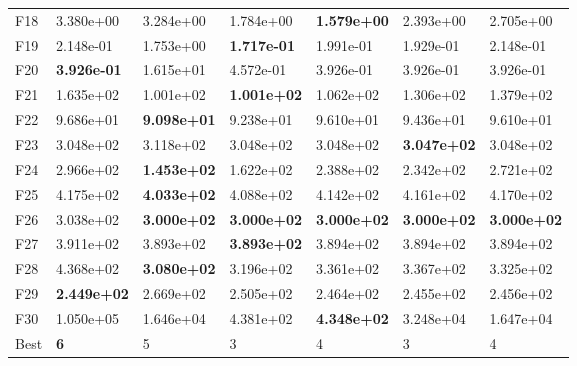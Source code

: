 \begin{tabular}{lllllll}
F18 & 3.380e+00 & 3.284e+00 & 1.784e+00 & \textbf{1.579e+00} & 2.393e+00 & 2.705e+00 \\
F19 & 2.148e-01 & 1.753e+00 & \textbf{1.717e-01} & 1.991e-01 & 1.929e-01 & 2.148e-01 \\
F20 & \textbf{3.926e-01} & 1.615e+01 & 4.572e-01 & 3.926e-01 & 3.926e-01 & 3.926e-01 \\
F21 & 1.635e+02 & 1.001e+02 & \textbf{1.001e+02} & 1.062e+02 & 1.306e+02 & 1.379e+02 \\
F22 & 9.686e+01 & \textbf{9.098e+01} & 9.238e+01 & 9.610e+01 & 9.436e+01 & 9.610e+01 \\
F23 & 3.048e+02 & 3.118e+02 & 3.048e+02 & 3.048e+02 & \textbf{3.047e+02} & 3.048e+02 \\
F24 & 2.966e+02 & \textbf{1.453e+02} & 1.622e+02 & 2.388e+02 & 2.342e+02 & 2.721e+02 \\
F25 & 4.175e+02 & \textbf{4.033e+02} & 4.088e+02 & 4.142e+02 & 4.161e+02 & 4.170e+02 \\
F26 & 3.038e+02 & \textbf{3.000e+02} & \textbf{3.000e+02} & \textbf{3.000e+02} & \textbf{3.000e+02} & \textbf{3.000e+02} \\
F27 & 3.911e+02 & 3.893e+02 & \textbf{3.893e+02} & 3.894e+02 & 3.894e+02 & 3.894e+02 \\
F28 & 4.368e+02 & \textbf{3.080e+02} & 3.196e+02 & 3.361e+02 & 3.367e+02 & 3.325e+02 \\
F29 & \textbf{2.449e+02} & 2.669e+02 & 2.505e+02 & 2.464e+02 & 2.455e+02 & 2.456e+02 \\
F30 & 1.050e+05 & 1.646e+04 & 4.381e+02 & \textbf{4.348e+02} & 3.248e+04 & 1.647e+04 \\
\midrule
Best & \textbf{6} & 5 & 3 & 4 & 3 & 4 \\
\bottomrule
\end{tabular}
